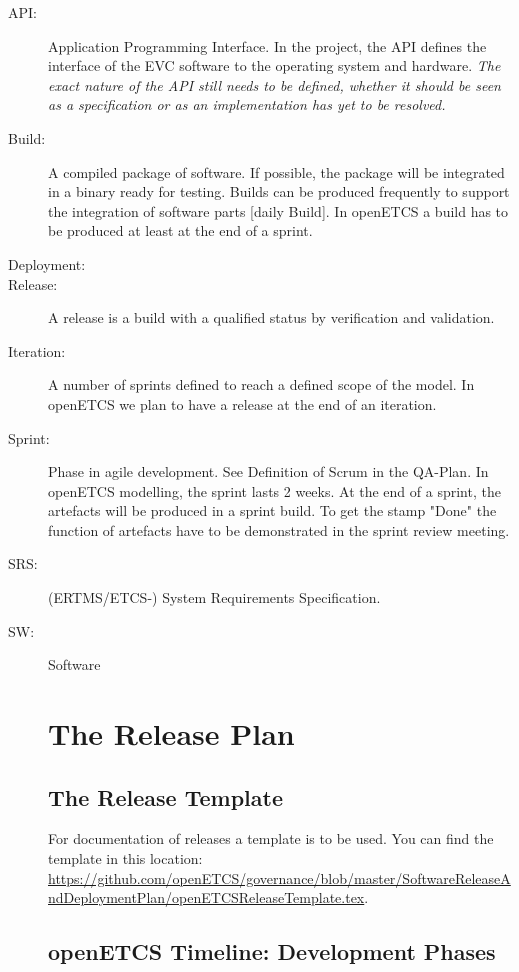 \documentclass{template/openetcs_report}
\begin{document}
\begin{description}
\item[API:] Application Programming Interface. In the project, the API defines 
the interface of the EVC software to the operating system and hardware. \textit{The
exact nature of the API still needs to be defined, whether it should be seen as
a specification or as an implementation has yet to be resolved.}
\item[Build:] A compiled package of software. If possible, the package will be integrated in a binary ready for testing. Builds can be produced frequently to support the integration of software parts [daily Build]. In openETCS a build has to be produced at least at the end of a sprint.
\item[Deployment:]
\item[Release:] A release is a build with a qualified status by verification and validation.
\item[Iteration:] A number of sprints defined to reach a defined scope of the model. In openETCS we plan to have a release at the end of an iteration.
\item[Sprint:] Phase in agile development. See Definition of Scrum in the QA-Plan. In openETCS modelling, the sprint lasts 2 weeks. At the end of a sprint, the artefacts will be produced in a sprint build. To get the stamp "Done" the function of artefacts have to be demonstrated in the sprint review meeting.
\item[SRS:] (ERTMS/ETCS-) System Requirements Specification. 
\item[SW:] Software

\chapter{The Release Plan}

\section{The Release Template}
For documentation of releases a template is to be used. You can find the template in this location: \url{https://github.com/openETCS/governance/blob/master/SoftwareReleaseAndDeploymentPlan/openETCSReleaseTemplate.tex}.

\section{openETCS Timeline: Development Phases}


\end{description}
\end{document}
